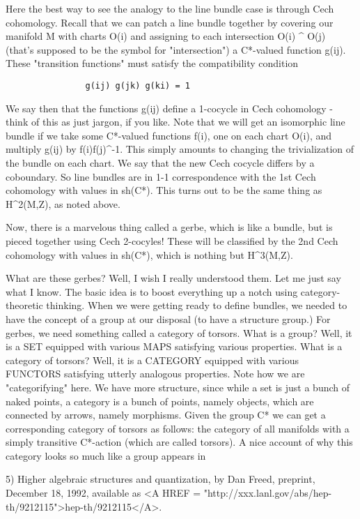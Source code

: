 Here the best way to see the analogy to the line bundle case is through
Cech cohomology.  Recall that we can patch a line bundle together by
covering our manifold M with charts O(i) and assigning to each
intersection O(i) ^ O(j) (that's supposed to be the symbol for
"intersection") a C*-valued function g(ij).  These "transition
functions" must satisfy the compatibility condition

\begin{verbatim}
                g(ij) g(jk) g(ki) = 1
\end{verbatim}
    

We say then that the functions g(ij) define a 1-cocycle in Cech
cohomology - think of this as just jargon, if you like.  Note that we
will get an isomorphic line bundle if we take some C*-valued functions
f(i), one on each chart O(i), and multiply g(ij) by f(i)f(j)^{-1}.  This
simply amounts to changing the trivialization of the bundle on each
chart.  We say that the new Cech cocycle differs by a coboundary.  
So line bundles are in 1-1 correspondence with the 1st Cech cohomology
with values in sh(C*).  This turns out to be the same thing as H^2(M,Z),
as noted above.

Now, there is a marvelous thing called a gerbe, which is like a bundle,
but is pieced together using Cech 2-cocyles!  These will be classified
by the 2nd Cech cohomology with values in sh(C*), which is nothing but
H^3(M,Z).  

What are these gerbes?  Well, I wish I really understood them.  Let me
just say what I know.  The basic idea is to boost everything up a notch
using category-theoretic thinking.  When we were getting ready to define
bundles, we needed to have the concept of a group at our disposal (to
have a structure group.)  For gerbes, we need something called a category
of torsors.  What is a group?  Well, it is a SET equipped with various MAPS
satisfying various properties.  What is a category of torsors?  Well, it is a
CATEGORY equipped with various FUNCTORS satisfying utterly analogous
properties.  Note how we are "categorifying" here.  We have more
structure, since while a set is just a bunch of naked points, a category
is a bunch of points, namely objects, which are connected by arrows,
namely morphisms.  Given the group C* we can get a corresponding category
of torsors as follows: the category of all manifolds with a simply transitive
C*-action (which are called torsors).  A nice account of why this category 
looks so much like a group appears in 

5) Higher algebraic structures and quantization, by Dan Freed,
preprint, December 18, 1992, available as <A HREF = "http://xxx.lanl.gov/abs/hep-th/9212115">hep-th/9212115</A>.  

